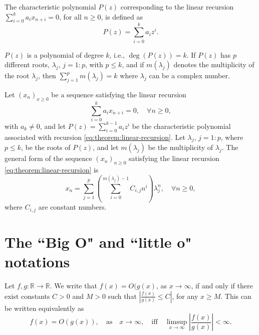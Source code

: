 \begin{definition}
    The characteristic polynomial $ P(z) $ corresponding to the linear
        recursion $ \sum_{i=0}^{k} a_i x_{n+i} = 0 $, for all $ n \geq 0 $, is
        defined as
    \begin{equation}
        P(z) = \sum_{i=0}^{k} a_i z^i.
    \end{equation}
\end{definition}

$ P(z) $ is a polynomial of degree $ k $, i.e., $ \deg(P(z)) = k $.
If $ P(z) $ has $ p $ different roots, $ \lambda_j $, $ j = 1 : p $, with
    $ p \leq k $, and if $ m(\lambda_j) $ denotes the multiplicity of the root
    $ \lambda_j $, then $ \sum_{j=1}^{p} m(\lambda_j) = k $ where
    $ \lambda_j $ can be a complex number.

\begin{theorem}\label{thm:linear-recursion}
    Let $ (x_n)_{x \geq 0} $ be a sequence satisfying the linear recursion
    \begin{equation}
        \sum_{i=0}^{k} a_i x_{n+i} = 0, \quad \forall n \geq 0,
        \label{eq:theorem:linear-recursion}
    \end{equation}
    with $ a_k \neq 0 $, and let $ P(z) = \sum_{i=0}^{k-1} a_i z^i $ be the
        characteristic polynomial associated with recursion
        \eqref{eq:theorem:linear-recursion}.
    Let $ \lambda_j $, $ j = 1 : p $, where $ p \leq k $, be the roots of
        $ P(z) $, and let $ m(\lambda_j) $ be the multiplicity of $ \lambda_j $.
    The general form of the sequence $ (x_n)_{n \geq 0} $ satisfying the linear
        recursion \eqref{eq:theorem:linear-recursion} is
    \begin{equation}
        x_n = \sum_{j=1}^{p} \left( \sum_{i=0}^{m(\lambda_j)-1} C_{i,j} n^i
            \right) \lambda_j^n, \quad \forall n \geq 0,
        \label{eq:theorem:linear-recursion-sequence}
    \end{equation}
    where $ C_{i,j} $ are constant numbers.
\end{theorem}

\section{The ``Big O" and ``little o" notations}
\begin{definition}
    Let $ f,g : \mathbb{R} \rightarrow \mathbb{R} $.
    We write that $ f(x) = O(g(x) $, as $ x \rightarrow \infty $, if and only if
        there exist constants $ C > 0 $ and $ M > 0 $ such that
        $ \left| \frac{f(x)}{g(x)} \leq C \right| $, for any $ x \geq M $.
    This can be written equivalently as
    \begin{equation}
        f(x) = O(g(x)), \quad \text{as} \quad x \rightarrow \infty, \quad
            \text{iff} \quad \limsup_{x \rightarrow \infty} \left|
            \frac{f(x)}{g(x)} \right| < \infty.
        \label{eq:definition:big-o}
    \end{equation}
\end{definition}

